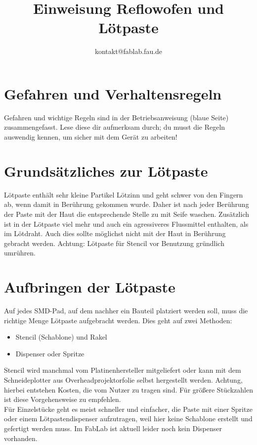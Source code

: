 \documentclass{\basedir/fablab-document}
\author{kontakt@fablab.fau.de}
\title{Einweisung Reflowofen und Lötpaste}
\begin{document}
\tableofcontents

\section{Gefahren und Verhaltensregeln}
Gefahren und wichtige Regeln sind in der Betriebsanweisung (blaue Seite) zusammengefasst. Lese diese dir aufmerksam durch; du musst die Regeln auswendig kennen, um sicher mit dem Gerät zu arbeiten!


\section{Grundsätzliches zur Lötpaste}
Lötpaste enthält sehr kleine Partikel Lötzinn und geht schwer von den Fingern ab, wenn damit in Berührung gekommen wurde. Daher ist nach jeder Berührung der Paste mit der Haut die entsprechende Stelle zu mit Seife waschen. Zusätzlich ist in der Lötpaste viel mehr und auch ein agressiveres Flussmittel enthalten, als im Lötdraht. Auch dies sollte möglichst nicht mit der Haut in Berührung gebracht werden. Achtung: Lötpaste für Stencil vor Benutzung gründlich umrühren.

\section{Aufbringen der Lötpaste}
Auf jedes SMD-Pad, auf dem nachher ein Bauteil platziert werden soll, muss die richtige Menge Lötpaste aufgebracht werden. Dies geht auf zwei Methoden:
\begin{itemize}
	\item Stencil (Schablone) und Rakel
	\item Dispenser oder Spritze
\end{itemize}
Stencil wird manchmal vom Platinenhersteller mitgeliefert oder kann mit dem Schneideplotter aus Overheadprojektorfolie selbst hergestellt werden. Achtung, hierbei entstehen Kosten, die vom Nutzer zu tragen sind. Für größere Stückzahlen ist diese Vorgehensweise zu empfehlen.\\
Für Einzelstücke geht es meist schneller und einfacher, die Paste mit einer Spritze oder einem Lötpastendispenser aufzutragen, weil hier keine Schablone erstellt und gefertigt werden muss. Im FabLab ist aktuell leider noch kein Dispenser vorhanden.
\end{document}
